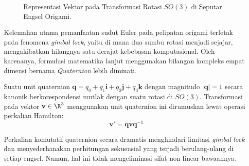 \begin{figure}[H]
  \centering
  \caption{Representasi Vektor pada Transformasi Rotasi $SO(3)$ di Seputar Engsel Origami.}
  \label{fig:kinematics}
\end{figure}

Kelemahan utama pemanfaatan sudut Euler pada pelipatan origami terletak pada fenomena \textit{gimbal lock}, yaitu di mana dua sumbu rotasi menjadi sejajar, mengakibatkan hilangnya satu derajat kebebasan komputasional. Oleh karenanya, formulasi matematika lanjut menggunakan bilangan kompleks empat dimensi bernama \textit{Quaternion} lebih diminati.
\begin{definisi}
  Suatu unit quaternion $\mathbf{q} = q_0 + q_1 \mathbf{i} + q_2 \mathbf{j} + q_3 \mathbf{k}$ dengan magnitudo $|\mathbf{q}| = 1$ secara kanonik berkorespondensi mutlak dengan suatu rotasi di $SO(3)$. Transformasi pada vektor $\mathbf{v} \in \R^3$ menggunakan unit quaternion ini dirumuskan lewat operasi perkalian Hamilton:
  \[
    \mathbf{v}' = \mathbf{q} \mathbf{v} \mathbf{q}^{-1}
  \]
\end{definisi}
Perkalian komutatif quaternion secara dramatis menghindari limitasi \textit{gimbal lock} dan menyederhanakan perhitungan sekuensial yang terjadi berulang-ulang di setiap engsel. Namun, hal ini tidak mengeliminasi sifat non-linear bawaannya.

